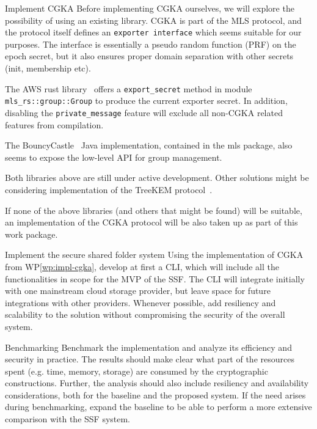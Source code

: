 \documentclass[E]{BAMASA}
\begin{document}
\begin{workpackage}{Implement CGKA}\label{wp:impl-cgka}
    Before implementing CGKA ourselves, we will explore the possibility of using an existing library.
    CGKA is part of the MLS protocol, and the protocol itself defines an \texttt{exporter interface} which
    seems suitable for our purposes. 
    The interface is essentially a pseudo random function (PRF) on the epoch secret, but it also ensures 
    proper domain separation with other secrets (init, membership etc).

    The AWS rust library~\cite{AWSMLSrs} offers a \texttt{export\_secret} method in module 
    \texttt{mls\_rs::group::Group} to produce the current exporter secret. In addition, disabling the \texttt{private\_message} feature 
    will exclude all non-CGKA related features from compilation.

    The BouncyCastle~\cite{BouncyCastle} Java implementation, contained in the mls package, also seems to expose the
    low-level API for group management.

    Both libraries above are still under active development. Other solutions might be considering
    implementation of the TreeKEM protocol~\cite{TreeKEMimpl}.

    If none of the above libraries (and others that might be found) will be suitable, an implementation of
    the CGKA protocol will be also taken up as part of this work package.
    

\end{workpackage}

\begin{workpackage}{Implement the secure shared folder system}\label{wp:impl-ssf}
    Using the implementation of CGKA from WP\ref{wp:impl-cgka}, develop at first a CLI, 
    which will include all the functionalities in scope for the MVP of the SSF.
    The CLI will integrate initially with one mainstream cloud storage provider, but 
    leave space for future integrations with other providers. 
    Whenever possible, add resiliency and scalability to the solution without
    compromising the security of the overall system.
\end{workpackage}

\begin{workpackage}{Benchmarking}\label{wp:benchmark}
	Benchmark the implementation and analyze its efficiency and security in practice. 
    The results should make clear what part of the resources spent (e.g. time, memory, storage) 
    are consumed by the cryptographic constructions. Further, the analysis should also include
    resiliency and availability considerations, both for the baseline and the proposed system.  
    If the need arises during benchmarking, expand the baseline to be able to perform a more
    extensive comparison with the SSF system.
\end{workpackage}
\end{document}

